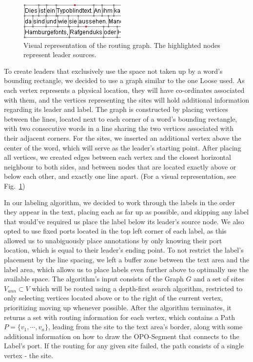 \documentclass[11pt,a4paper]{vutinfth}
\begin{document}
\begin{figure}%
 \captionsetup{justification=centering, margin=0.75cm}
 \centering
  \includegraphics[scale=1.0]{RoutingGraphPartial_NoBorders.png}
  \caption{Visual representation of the routing graph. The highlighted nodes represent leader sources.}
 \label{fig:RGraph}
\end{figure}
To create leaders that exclusively use the space not taken up by a word's bounding rectangle, we decided to use a graph similar to the one Loose \cite{Loose2015} used.
As each vertex represents a physical location, they will have co-ordinates associated with them, and the vertices representing the sites will hold additional information regarding its leader and label. 
The graph is constructed by placing vertices between the lines, located next to each corner of a word's bounding rectangle, with two consecutive words in a line sharing the two vertices associated with their adjacent corners. %
For the sites, we inserted an additional vertex above the center of the word, which will serve as the leader's starting point. After placing all vertices, we created edges between each vertex and the closest horizontal neighbour to both sides, and between nodes that are located exactly above or below each other, and exactly one line apart. (For a visual representation, see Fig.~\ref{fig:RGraph})

In our labeling algorithm, we decided to work through the labels in the order they appear in the text, placing each as far up as possible, and skipping any label that would've required us place the label below its leader's source node. We also opted to use fixed ports located in the top left corner of each label, as this allowed us to unabiguously place annotations by only knowing their port location, which is equal to their leader's ending point. To not restrict the label's placement by the line spacing, we left a buffer zone between the text area and the label area, which allows us to place labels even further above to optimally use the available space.
The algorithm's input consists of the Graph $G$ and a set of sites $V_{ann} \subset V$ which will be routed using a depth-first search algorithm, restricted to only selecting vertices located above or to the right of the current vertex, prioritizing moving up whenever possible. After the algorithm terminates, it returns a set with routing information for each vertex, which contains a Path $P=\{v_1, \cdots, v_n\}$, leading from the site to the text area's border, along with some additional information on how to draw the OPO-Segment that connects to the Label's port. If the routing for any given site failed, the path consists of a single vertex - the site.
\end{document}
